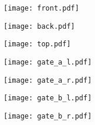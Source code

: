 \documentclass[10pt,a4paper]{article}
\begin{document}
\texttt{[image: front.pdf]}

\texttt{[image: back.pdf]}

\pagebreak

\texttt{[image: top.pdf]}

\texttt{[image: gate\_a\_l.pdf]}

\texttt{[image: gate\_a\_r.pdf]}

\texttt{[image: gate\_b\_l.pdf]}

\texttt{[image: gate\_b\_r.pdf]}
\end{document}
